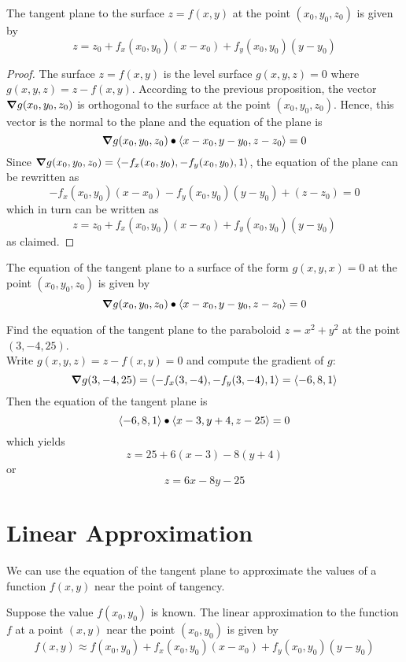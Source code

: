 \documentclass[handout]{ximera}
\begin{document}
\begin{theorem}
The tangent plane to the surface $z = f(x,y)$ at the point $(x_0, y_0, z_0)$ is given by
\[
z = z_0 + f_x(x_0, y_0)(x - x_0) + f_y(x_0, y_0)(y - y_0)
\]
\end{theorem}
\begin{proof}
The surface $z = f(x,y)$ is the level surface $g(x,y,z) = 0$ where $g(x,y,z) = z - f(x,y)$.
According to the previous proposition, the vector $\boldsymbol\nabla g(x_0, y_0, z_0)$ is orthogonal to the surface at the point $(x_0, y_0, z_0)$.
Hence, this vector is the normal to the plane and the equation of the plane is
\[
\boldsymbol\nabla g(x_0, y_0, z_0) \bullet \left\langle x- x_0, y-y_0, z-z_0\right\rangle = 0
\]
Since $\boldsymbol\nabla g(x_0, y_0, z_0) = \left\langle -f_x(x_0, y_0), -f_y(x_0, y_0), 1\right\rangle$, 
the equation of the plane can be rewritten as
\[
-f_x(x_0, y_0)(x-x_0) - f_y(x_0, y_0)(y-y_0) + (z-z_0) = 0
\]
which in turn can be written as
\[
z = z_0 + f_x(x_0, y_0)(x-x_0) + f_y(x_0, y_0)(y-y_0)
\]
as claimed.
\end{proof}

\begin{corollary}
The equation of the tangent plane to a surface of the form $g(x, y, x) = 0$ at the point $(x_0, y_0, z_0)$ is given by
\[
\boldsymbol\nabla g(x_0, y_0, z_0) \bullet \left\langle x - x_0, y - y_0, z - z_0\right\rangle = 0
\]
\end{corollary}

\begin{example}[Example 3]
Find the equation of the tangent plane to the paraboloid $z = x^2 + y^2$ at the point $(3, -4, 25)$.\\
Write $g(x, y, z) = z - f(x,y) = 0$ and compute the gradient of $g$:
\[
\boldsymbol\nabla g(3, -4, 25) = \left\langle -f_x(3, -4), -f_y(3, -4), 1\right\rangle = \left\langle -6, 8, 1\right\rangle
\]
Then the equation of the tangent plane is
\[
\left\langle -6, 8, 1\right\rangle \bullet \left\langle x-3, y+4, z-25\right\rangle = 0
\]
which yields
\[
z = 25 + 6(x-3) - 8(y+4)
\]
or
\[
z = 6x - 8y - 25
\]
\end{example}

\section{Linear Approximation}
We can use the equation of the tangent plane to approximate the values of a function $f(x,y)$ near the point of tangency.

Suppose the value $f(x_0, y_0)$ is known. The linear approximation to the function $f$ at a point $(x,y)$ near the point $(x_0, y_0)$
is given by
\[
f(x,y) \approx f(x_0, y_0) + f_x(x_0, y_0)(x-x_0) + f_y(x_0, y_0)(y-y_0)
\]
\end{document}
